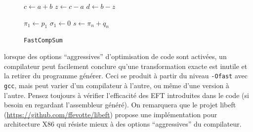 \documentclass[a4paper]{article}
\newenvironment{warn}[1][Attention :]{
  \begin{mdframed}[style=warning]
    \noindent{\bf #1}
}{
  \end{mdframed}
}
\begin{document}
\begin{figure}[htbp]
\strut\hfill
\begin{minipage}[t]{0.4\linewidth}
  \vspace{0pt}
  \begin{algorithm}[H]
    \medskip
    $c \leftarrow a + b$ \;
    $z \leftarrow c - a$ \;
    $d \leftarrow b - z$ \;
    \caption{\tt FastTwoSum}\label{alg:fastTwoSum}
  \end{algorithm}
\end{minipage}
\hfill%
\begin{minipage}[t]{0.4\linewidth}
  \vspace{0pt}
  \begin{algorithm}[H]
    \smallskip
    \medskip
    $\pi_1 \leftarrow p_1$ \;
    $\sigma_1 \leftarrow 0$ \;
    $s \leftarrow \pi_n + q_n$ \;
    \caption{\tt FastCompSum}\label{alg:fastCompSum}
  \end{algorithm}
\end{minipage}
\hfill\strut
\end{figure}

\FloatBarrier

\begin{warn}
  lorsque des options ``aggressives'' d'optimisation de code sont activées, un
  compilateur peut facilement conclure qu'une transformation exacte est inutile
  et la retirer du programme générer. Ceci se produit à partir du niveau
  \texttt{-Ofast} avec \texttt{gcc}, mais peut varier d'un compilateur à
  l'autre, ou même d'une version à l'autre. Pensez toujours à vérifier
  l'efficacité des EFT introduites dans le code (si besoin en regardant
  l'assembleur généré). On remarquera que le projet libeft
  (\url{https://github.com/ffevotte/libeft}) propose une
  implémentation pour architecture X86 qui résiste mieux à des options
  ``aggressives'' du compilateur.
  
\end{warn}
\end{document}
